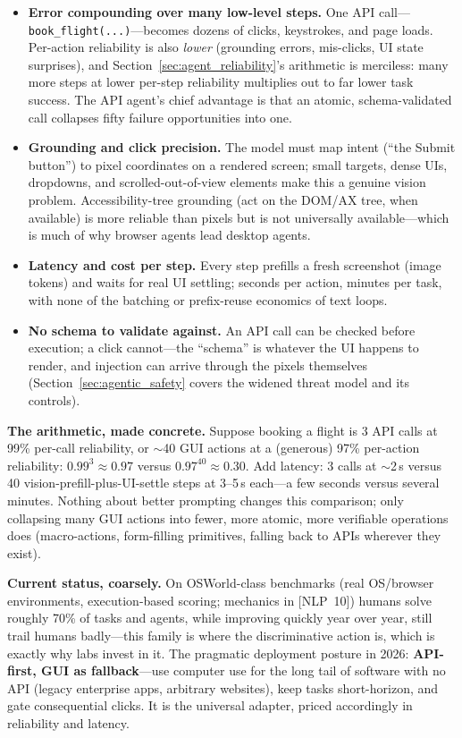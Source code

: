 \begin{itemize}
    \item \textbf{Error compounding over many low-level steps.} One API call---\texttt{book\_flight(...)}---becomes dozens of clicks, keystrokes, and page loads. Per-action reliability is also \textit{lower} (grounding errors, mis-clicks, UI state surprises), and Section~\ref{sec:agent_reliability}'s arithmetic is merciless: many more steps at lower per-step reliability multiplies out to far lower task success. The API agent's chief advantage is that an atomic, schema-validated call collapses fifty failure opportunities into one.
    \item \textbf{Grounding and click precision.} The model must map intent (``the Submit button'') to pixel coordinates on a rendered screen; small targets, dense UIs, dropdowns, and scrolled-out-of-view elements make this a genuine vision problem. Accessibility-tree grounding (act on the DOM/AX tree, when available) is more reliable than pixels but is not universally available---which is much of why browser agents lead desktop agents.
    \item \textbf{Latency and cost per step.} Every step prefills a fresh screenshot (image tokens) and waits for real UI settling; seconds per action, minutes per task, with none of the batching or prefix-reuse economics of text loops.
    \item \textbf{No schema to validate against.} An API call can be checked before execution; a click cannot---the ``schema'' is whatever the UI happens to render, and injection can arrive through the pixels themselves (Section~\ref{sec:agentic_safety} covers the widened threat model and its controls).
\end{itemize}

\textbf{The arithmetic, made concrete.} Suppose booking a flight is 3 API calls at 99\% per-call reliability, or $\sim$40 GUI actions at a (generous) 97\% per-action reliability: $0.99^3 \approx 0.97$ versus $0.97^{40} \approx 0.30$. Add latency: 3 calls at $\sim$2\,s versus 40 vision-prefill-plus-UI-settle steps at 3--5\,s each---a few seconds versus several minutes. Nothing about better prompting changes this comparison; only collapsing many GUI actions into fewer, more atomic, more verifiable operations does (macro-actions, form-filling primitives, falling back to APIs wherever they exist).

\textbf{Current status, coarsely.} On OSWorld-class benchmarks (real OS/browser environments, execution-based scoring; mechanics in [NLP~10]) humans solve roughly 70\% of tasks and agents, while improving quickly year over year, still trail humans badly---this family is where the discriminative action is, which is exactly why labs invest in it. The pragmatic deployment posture in 2026: \textbf{API-first, GUI as fallback}---use computer use for the long tail of software with no API (legacy enterprise apps, arbitrary websites), keep tasks short-horizon, and gate consequential clicks. It is the universal adapter, priced accordingly in reliability and latency.

